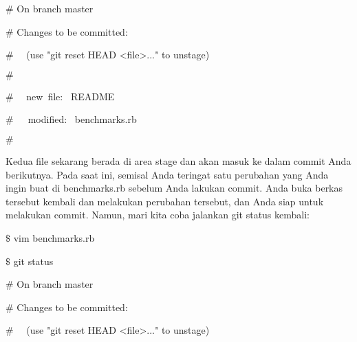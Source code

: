 \noindent 
{\fontsize{14pt}{14pt}\selectfont  $  \#  $ On branch master \\} \par
\noindent 
{\fontsize{14pt}{14pt}\selectfont  $  \#  $ Changes to be committed: \\} \par
\noindent 
{\fontsize{14pt}{14pt}\selectfont  $  \#  $~~ (use "git reset HEAD <file>..." to unstage) \\} \par
\noindent 
{\fontsize{14pt}{14pt}\selectfont  $  \#  $ \\} \par
\noindent 
{\fontsize{14pt}{14pt}\selectfont  $  \#  $~~ new~file:~  README \\} \par
\noindent 
{\fontsize{14pt}{14pt}\selectfont  $  \#  $~~~modified:~  benchmarks.rb \\} \par
\noindent 
{\fontsize{14pt}{14pt}\selectfont  $  \#  $ \\} \par
\vspace{14pt}
\noindent 
{\fontsize{14pt}{14pt}\selectfont Kedua file sekarang berada di area stage dan akan masuk ke dalam commit Anda berikutnya. Pada saat ini, semisal Anda teringat satu perubahan yang Anda ingin buat di benchmarks.rb sebelum Anda lakukan commit. Anda buka berkas tersebut kembali dan melakukan perubahan tersebut, dan Anda siap untuk melakukan commit. Namun, mari kita coba jalankan $  $git status $  $kembali: \\} \par
\vspace{14pt}
\noindent 
{\fontsize{14pt}{14pt}\selectfont  $  \$  $ vim benchmarks.rb \\} \par
\noindent 
{\fontsize{14pt}{14pt}\selectfont  $  \$  $ git status \\} \par
\noindent 
{\fontsize{14pt}{14pt}\selectfont  $  \#  $ On branch master \\} \par
\noindent 
{\fontsize{14pt}{14pt}\selectfont  $  \#  $ Changes to be committed: \\} \par
\noindent 
{\fontsize{14pt}{14pt}\selectfont  $  \#  $~~ (use "git reset HEAD <file>..." to unstage) \\} \par
\noindent 
